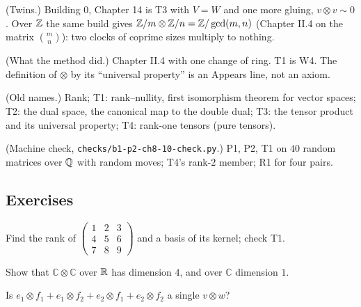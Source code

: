 \begin{lines}
\item[\lab{R1}] (Twins.) Building 0, Chapter 14 is T3 with $V = W$ and one more gluing, $v \otimes v \sim 0$. Over $\mathbb{Z}$ the same build gives $\mathbb{Z}/m \otimes \mathbb{Z}/n = \mathbb{Z}/\gcd(m, n)$ (Chapter II.4 on the matrix $\binom{m}{n}$): two clocks of coprime sizes multiply to nothing.
\item[\lab{R2}] (What the method did.) Chapter II.4 with one change of ring. T1 is W4. The definition of $\otimes$ by its ``universal property'' is an Appears line, not an axiom.
\item[\lab{R3}] (Old names.) Rank; T1: rank--nullity, first isomorphism theorem for vector spaces; T2: the dual space, the canonical map to the double dual; T3: the tensor product and its universal property; T4: rank-one tensors (pure tensors).
\item[\lab{R4}] (Machine check, \texttt{checks/b1-p2-ch8-10-check.py}.) P1, P2, T1 on $40$ random matrices over $\mathbb{Q}$ with random moves; T4's rank-$2$ member; R1 for four pairs.
\end{lines}

\subsection*{Exercises}

\begin{lines}
\item[\lab{E1}] Find the rank of $\begin{pmatrix} 1 & 2 & 3 \\ 4 & 5 & 6 \\ 7 & 8 & 9 \end{pmatrix}$ and a basis of its kernel; check T1.
\item[\lab{E2}] Show that $\mathbb{C} \otimes \mathbb{C}$ over $\mathbb{R}$ has dimension $4$, and over $\mathbb{C}$ dimension $1$.
\item[\lab{E3}] Is $e_1 \otimes f_1 + e_1 \otimes f_2 + e_2 \otimes f_1 + e_2 \otimes f_2$ a single $v \otimes w$?
\end{lines}

\newpage

